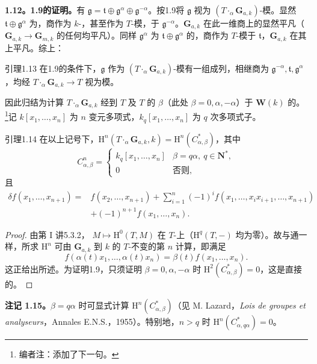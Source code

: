 \textbf{1.12。1.9的证明。}有 $\mathfrak g=\mathfrak t\oplus\mathfrak g^\alpha\oplus\mathfrak g^{-\alpha}$。按1.9将 $\mathfrak g$ 视为 $(T\mathbin{\cdot}_\alpha\mathbf G_{a,k})$-模。显然 $\mathfrak t\oplus\mathfrak g^\alpha$ 为，商作为 $k$-，甚至作为 $T$-模，于 $\mathfrak g^{-\alpha}$。$\mathbf G_{a,k}$ 在此一维商上的显然平凡（$\mathbf G_{a,k}\to\mathbf G_{m,k}$ 的任何均平凡）。同样 $\mathfrak g^\alpha$ 为 $\mathfrak t\oplus\mathfrak g^\alpha$ 的，商作为 $T$-模于 $\mathfrak t$，$\mathbf G_{a,k}$ 在其上平凡。综上：
\begin{SGAresult}{引理}{1.13}
在1.9的条件下，$\mathfrak g$ 作为 $(T\mathbin{\cdot}_\alpha\mathbf G_{a,k})$-模有一组成列，相继商为 $\mathfrak g^{-\alpha},\mathfrak t,\mathfrak g^\alpha$，均经 $T\mathbin{\cdot}_\alpha\mathbf G_{a,k}\to T$ 视为模。
\end{SGAresult}
因此归结为计算 $T\mathbin{\cdot}_\alpha\mathbf G_{a,k}$ 经到 $T$ 及 $T$ 的 $\beta$（此处 $\beta=0,\alpha,-\alpha$）于 $\mathbf W(k)$ 的。\footnote{编者注：添加了下一句。}记 $k[x_1,\ldots,x_n]$ 为 $n$ 变元多项式，$k_q[x_1,\ldots,x_n]$ 为 $q$ 次多项式子。
\begin{SGAresult}{引理}{1.14}
在以上记号下，$\mathrm H^n(T\mathbin{\cdot}_\alpha\mathbf G_{a,k},k)=\mathrm H^n(C^*_{\alpha,\beta})$，其中
\[C^n_{\alpha,\beta}=\begin{cases}k_q[x_1,\ldots,x_n]&\beta=q\alpha,\ q\in\mathbf N^*,\\0&\text{否则},\end{cases}\]
且
\[\begin{split}\delta f(x_1,\ldots,x_{n+1})={}&f(x_2,\ldots,x_{n+1})+\sum_{i=1}^n(-1)^if(x_1,\ldots,x_ix_{i+1},\ldots,x_{n+1})\\&+(-1)^{n+1}f(x_1,\ldots,x_n).\end{split}\]
\end{SGAresult}
\begin{proof}
由第 I 讲5.3.2， $M\mapsto\mathrm H^0(T,M)$ 在 $T$-上（$\mathrm H^q(T,-)$ 均为零）。故与通一样，所求 $\mathrm H^n$ 可由 $\mathbf G_{a,k}$ 到 $k$ 的 $T$-不变的第 $n$ 计算，即满足
\[f(\alpha(t)x_1,\ldots,\alpha(t)x_n)=\beta(t)f(x_1,\ldots,x_n).\]
这正给出所述。为证明1.9，只须证明 $\beta=0,\alpha,-\alpha$ 时 $\mathrm H^2(C^*_{\alpha,\beta})=0$，这是直接的。
\end{proof}
\textbf{注记 1.15。}$\beta=q\alpha$ 时可显式计算 $\mathrm H^n(C^*_{\alpha,\beta})$（见 M. Lazard，\textit{Lois de groupes et analyseurs}，Annales E.N.S.，1955）。特别地，$n>q$ 时 $\mathrm H^n(C^*_{\alpha,q\alpha})=0$。

